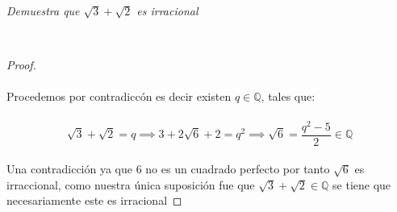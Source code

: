 \documentclass[11pt,letterpaper]{article}
\newcommand{\Z}{\mathbb{Z}}
\newcommand{\Q}{\mathbb{Q}}
\begin{document}
\begin{tcolorbox}[
	title = \textcolor{black}{\textcolor{white}{Problema 12}},]
\textit{
Demuestra que $\sqrt{3}+\sqrt{2}$ es irracional
}
\end{tcolorbox}\,\\
\begin{proof}\,\\
    \,\\
    Procedemos por contradicc\'on es decir existen $q\in \Q$, tales que:\,\\
    \,\\
    \begin{equation*}
        \sqrt{3}+\sqrt{2}=q\implies 3+2\sqrt{6}+2=q^2\implies\sqrt{6}=\frac{q^2-5}{2}\in \Q
    \end{equation*}\,\\
    Una contradicci\'on ya que $6$ no es un cuadrado perfecto por tanto $\sqrt{6}$ es irraccional, como nuestra \'unica suposici\'on fue que 
    $\sqrt{3}+\sqrt{2}\in \Q$ se tiene que necesariamente este es irracional
    
\end{proof}
\,\\
\end{document}
